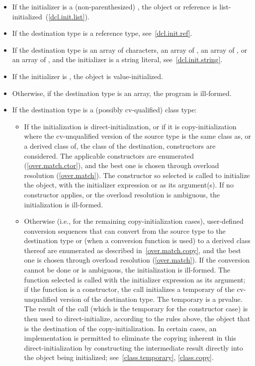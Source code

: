 \begin{itemize}
\item
If the initializer is a (non-parenthesized) , the object or reference
is list-initialized~(\ref{dcl.init.list}).
\item
If the destination type is a reference type, see~\ref{dcl.init.ref}.
\item
If the destination type is an array of characters,
an array of ,
an array of ,
or an array of
,
and the initializer is a string literal, see~\ref{dcl.init.string}.
\item If the initializer is \tcode{()}, the object is value-initialized.
\item
Otherwise, if the destination type is an array, the program is ill-formed.
\item
If the destination type is a (possibly cv-qualified) class type:

\begin{itemize}
\item
If the initialization is direct-initialization,
or if it is copy-initialization where the cv-unqualified version of the source
type is the same class as, or a derived class of, the class of the destination,
constructors are considered.
The applicable constructors
are enumerated (\ref{over.match.ctor}), and the best one is chosen
through overload resolution (\ref{over.match}).
The constructor so selected
is called to initialize the object, with the initializer
expression or  as its argument(s).
If no constructor applies, or the overload resolution is
ambiguous, the initialization is ill-formed.
\item
Otherwise (i.e., for the remaining copy-initialization cases),
user-defined conversion sequences that can convert from the
source type to the destination type or (when a conversion function
is used) to a derived class thereof are enumerated as described in~\ref{over.match.copy}, and the best one is chosen through overload
resolution (\ref{over.match}).  If the conversion cannot be done or
is ambiguous, the initialization is ill-formed.  The function
selected is called with the initializer expression as its
argument; if the function is a constructor, the call initializes
a temporary of the cv-unqualified version of the
destination type.  The temporary is a prvalue. The result of the call
(which is the temporary for the constructor case) is then used
to direct-initialize, according to the rules above, the object
that is the destination of the copy-initialization.  In certain
cases, an implementation is permitted to eliminate the copying
inherent in this direct-initialization by constructing the
intermediate result directly into the object being initialized;
see~\ref{class.temporary}, \ref{class.copy}.
\end{itemize}


\end{itemize}

